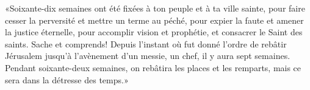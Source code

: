 «Soixante-dix semaines ont été fixées à ton peuple et à ta ville sainte,
	pour faire cesser la perversité et mettre un terme au péché,
	pour expier la faute et amener la justice éternelle,
	pour accomplir vision et prophétie, et consacrer le Saint des saints.
Sache et comprends!
	Depuis l’instant où fut donné l’ordre de rebâtir Jérusalem
	jusqu’à l’avènement d’un messie, un chef,
	il y aura sept semaines.
Pendant soixante-deux semaines, on rebâtira les places et les remparts,
	mais ce sera dans la détresse des temps.»

